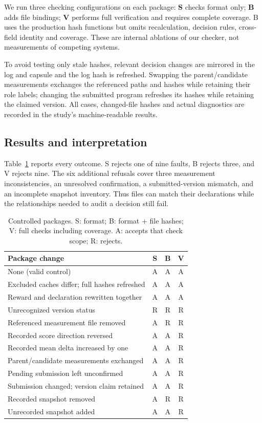 \documentclass[conference]{IEEEtran}
\begin{document}
We run three checking configurations on each package: \textbf{S} checks format only; \textbf{B} adds file bindings; \textbf{V} performs full verification and requires complete coverage. B uses the production hash functions but omits recalculation, decision rules, cross-field identity and coverage. These are internal ablations of our checker, not measurements of competing systems.

To avoid testing only stale hashes, relevant decision changes are mirrored in the log and capsule and the log hash is refreshed. Swapping the parent/candidate measurements exchanges the referenced paths and hashes while retaining their role labels; changing the submitted program refreshes its hashes while retaining the claimed version. All cases, changed-file hashes and actual diagnostics are recorded in the study's machine-readable results.

\subsection{Results and interpretation}
Table~\ref{tab:faults} reports every outcome. S rejects one of nine faults, B rejects three, and V rejects nine. The six additional refusals cover three measurement inconsistencies, an unresolved confirmation, a submitted-version mismatch, and an incomplete snapshot inventory. Thus files can match their declarations while the relationships needed to audit a decision still fail.

\begin{table}[t]
\caption{Controlled packages. S: format; B: format + file hashes; V: full checks including coverage. A: accepts that check scope; R: rejects.}
\label{tab:faults}
\centering\footnotesize
\begin{tabular}{p{}ccc}
\toprule
Package change & S & B & V\\
\midrule
None (valid control) & A&A&A\\
Excluded caches differ; full hashes refreshed & A&A&A\\
Reward and declaration rewritten together & A&A&A\\
\midrule
Unrecognized version status & R&R&R\\
Referenced measurement file removed & A&R&R\\
Recorded score direction reversed & A&A&R\\
Recorded mean delta increased by one & A&A&R\\
Parent/candidate measurements exchanged & A&A&R\\
Pending submission left unconfirmed & A&A&R\\
Submission changed; version claim retained & A&A&R\\
Recorded snapshot removed & A&R&R\\
Unrecorded snapshot added & A&A&R\\
\bottomrule
\end{tabular}
\end{table}
\end{document}
